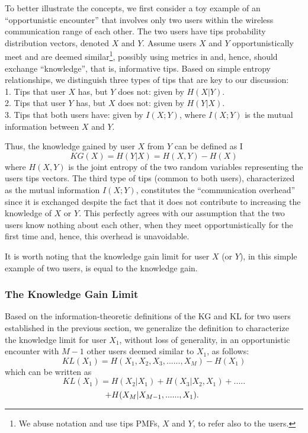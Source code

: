 \documentclass[conference]{IEEEtran}
\theoremstyle{definition}
\begin{document}
To better illustrate the concepts, we first consider a toy example of an ``opportunistic encounter'' that involves only two users within the wireless communication range of each other. The two users have tips probability distribution vectors, denoted $X$ and $Y$. Assume users $X$ and $Y$ opportunistically meet and are deemed similar\footnote{We abuse notation and use tips PMFs, $X$ and $Y$, to refer also to the users.}, possibly using metrics in \cite{mai14} and, hence, should exchange ``knowledge'', that is, informative tips. Based on simple entropy relationships, 
we distinguish three types of tips that are key to our discussion:\\
1. Tips that user $X$ has, but $Y$ does not: given by $H(X|Y)$.\\
2. Tips that user $Y$ has, but $X$ does not: given by $H(Y|X)$.\\
3. Tips that both users have: given by $I(X;Y)$, where $I(X;Y)$ is the mutual information between $X$ and $Y$.


Thus, the knowledge gained by user $X$ from $Y$ can be defined as
I\begin{equation}
KG(X) = H (Y|X) = H(X,Y) - H(X)
\end{equation}
where $H(X,Y)$ is the joint entropy of the two random variables representing the users tips vectors.
The third type of tips (common to both users), characterized as the mutual information $I(X;Y)$, constitutes the ``communication overhead'' since it is exchanged despite the fact that it does not contribute to increasing the knowledge of $X$ or $Y$. This perfectly 
agrees with our assumption that the two users know nothing about each other, when they meet opportunistically for the first time and, hence, this overhead is unavoidable.


It is worth noting that the knowledge gain limit for user $X$ (or $Y$), in this simple example of two users, is equal to the knowledge gain. 

\subsubsection{The Knowledge Gain Limit}
Based on the information-theoretic definitions of the KG and KL for two users established in the previous section, we generalize the definition to characterize the knowledge limit for user $X_1$, without loss of generality, in an opportunistic encounter with $M-1$ other users deemed similar to $X_1$, as follows: 
\vspace{-0.1 cm}
\begin{equation}
		KL(X_1) = H(X_1, X_2, X_3, ......, X_M) - H(X_1)
\end{equation}
which can be written as
\vspace{-0.1 cm}
\begin{equation}
KL(X_1) = H(X_2|X_1) + H(X_3|X_2,X_1) + .....
\nonumber
\end{equation}
\begin{equation}
\hspace *{-0.15 cm} + H(X_M|X_{M-1}, ......, X_1).
\end{equation}
\end{document}

